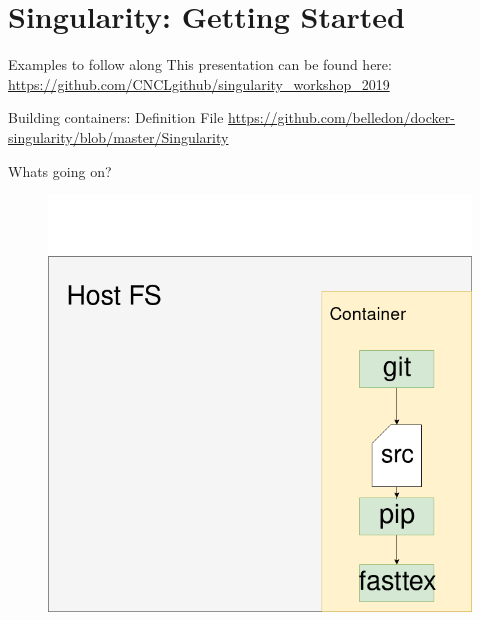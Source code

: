 \documentclass[10pt]{beamer}              %
\begin{document}
\section{Singularity: Getting Started}

\begin{frame}{Examples to follow along}
This presentation can be found here:\\
\url{https://github.com/CNCLgithub/singularity_workshop_2019}
\end{frame}


\begin{frame}[fragile]{Building containers: Definition File}
    \scriptsize{\url{https://github.com/belledon/docker-singularity/blob/master/Singularity}}
    \noindent\makebox[\linewidth]{\rule{\paperwidth}{0.4pt}}
\end{frame}
\begin{frame}[fragile]{Whats going on?}
    \begin{figure}[c]
    \includegraphics[scale=0.30]{media/images/workshop-diagrams-Host-concept-3-fasttext.png}
    \end{figure}
\end{frame}
\end{document}

